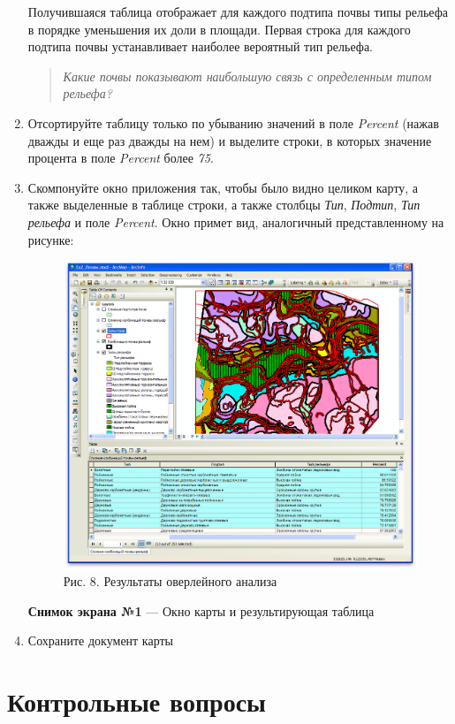 \documentclass[12pt,]{book}
\begin{document}
\begin{enumerate}
  Получившаяся таблица отображает для каждого подтипа почвы типы рельефа в порядке уменьшения их доли в площади. Первая строка для каждого подтипа почвы устанавливает наиболее вероятный тип рельефа.

  \begin{quote}
  \emph{Какие почвы показывают наибольшую связь с определенным типом рельефа?}
  \end{quote}
\item
  Отсортируйте таблицу только по убыванию значений в поле \emph{Percent} (нажав дважды и еще раз дважды на нем) и выделите строки, в которых значение процента в поле \emph{Percent} более \emph{75}.
\item
  Скомпонуйте окно приложения так, чтобы было видно целиком карту, а также выделенные в таблице строки, а также столбцы \emph{Тип}, \emph{Подтип}, \emph{Тип рельефа} и поле \emph{Percent}. Окно примет вид, аналогичный представленному на рисунке:

  \begin{figure}
  \centering
  \includegraphics{images/Ex10/image13.png}
  \caption{Рис. 8. Результаты оверлейного анализа}
  \end{figure}

  \textbf{Снимок экрана №1} --- Окно карты и результирующая таблица
\item
  Сохраните документ карты
\end{enumerate}

\hypertarget{overlay-questions}{%
\section{Контрольные вопросы}\label{overlay-questions}}
\end{document}
